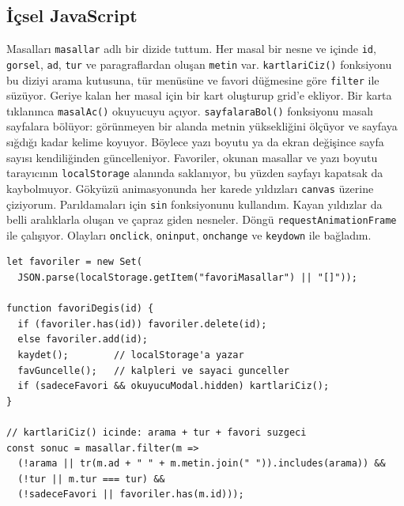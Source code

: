 \documentclass[12pt,a4paper]{article}
\begin{document}
\subsection{İçsel JavaScript}
Masalları \texttt{masallar} adlı bir dizide tuttum. Her masal bir nesne ve içinde \texttt{id}, \texttt{gorsel}, \texttt{ad}, \texttt{tur} ve paragraflardan oluşan \texttt{metin} var. \texttt{kartlariCiz()} fonksiyonu bu diziyi arama kutusuna, tür menüsüne ve favori düğmesine göre \texttt{filter} ile süzüyor. Geriye kalan her masal için bir kart oluşturup grid'e ekliyor. Bir karta tıklanınca \texttt{masalAc()} okuyucuyu açıyor. \texttt{sayfalaraBol()} fonksiyonu masalı sayfalara bölüyor: görünmeyen bir alanda metnin yüksekliğini ölçüyor ve sayfaya sığdığı kadar kelime koyuyor. Böylece yazı boyutu ya da ekran değişince sayfa sayısı kendiliğinden güncelleniyor. Favoriler, okunan masallar ve yazı boyutu tarayıcının \texttt{localStorage} alanında saklanıyor, bu yüzden sayfayı kapatsak da kaybolmuyor. Gökyüzü animasyonunda her karede yıldızları \texttt{canvas} üzerine çiziyorum. Parıldamaları için \texttt{sin} fonksiyonunu kullandım. Kayan yıldızlar da belli aralıklarla oluşan ve çapraz giden nesneler. Döngü \texttt{requestAnimationFrame} ile çalışıyor. Olayları \texttt{onclick}, \texttt{oninput}, \texttt{onchange} ve \texttt{keydown} ile bağladım.

\begin{lstlisting}[caption={İçsel JavaScript'ten önemli bir bölüm}]
let favoriler = new Set(
  JSON.parse(localStorage.getItem("favoriMasallar") || "[]"));

function favoriDegis(id) {
  if (favoriler.has(id)) favoriler.delete(id);
  else favoriler.add(id);
  kaydet();        // localStorage'a yazar
  favGuncelle();   // kalpleri ve sayaci gunceller
  if (sadeceFavori && okuyucuModal.hidden) kartlariCiz();
}

// kartlariCiz() icinde: arama + tur + favori suzgeci
const sonuc = masallar.filter(m =>
  (!arama || tr(m.ad + " " + m.metin.join(" ")).includes(arama)) &&
  (!tur || m.tur === tur) &&
  (!sadeceFavori || favoriler.has(m.id)));
\end{lstlisting}
\end{document}

